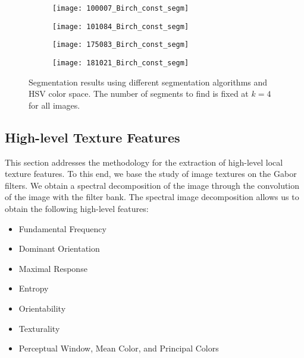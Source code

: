 \begin{figure}[!ht]
    \begin{subfigure}[t]{\textwidth+20pt\relax}
    	\centering
    	\texttt{[image: 100007\_Birch\_const\_segm]} 
    \end{subfigure}      
    \begin{subfigure}[b]{0.23\textwidth}
    	\centering
        \texttt{[image: 101084\_Birch\_const\_segm]}
    \end{subfigure}
    \begin{subfigure}[b]{0.23\textwidth}
    	\centering
        \texttt{[image: 175083\_Birch\_const\_segm]}
    \end{subfigure}
    \begin{subfigure}[b]{0.23\textwidth}
    	\centering
        \texttt{[image: 181021\_Birch\_const\_segm]}
    \end{subfigure}     
	\caption{Segmentation results using different segmentation algorithms and HSV color space. The number of segments to find is fixed at $ k = 4 $ for all images. }\label{fig:BSD_clustering_results}    
\end{figure}


\subsection{High-level Texture Features}\label{sec:high_level_features}
This section addresses the methodology for the extraction of high-level local texture features. To this end, we base the study of image textures on the Gabor filters. We obtain a spectral decomposition of the image through the convolution of the image with the filter bank. The spectral image decomposition allows us to obtain the following high-level features:

\begin{itemize}
	\item Fundamental Frequency
	\item Dominant Orientation
	\item Maximal Response
	\item Entropy
	\item Orientability
	\item Texturality 
	\item Perceptual Window, Mean Color, and Principal Colors
\end{itemize}

